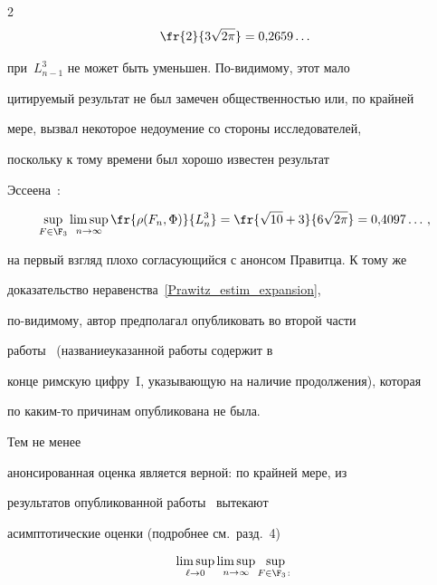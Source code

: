 \begin{multicols}{2}
$$


\fr{2}{3\sqrt{2\pi}}=0{,}2659\ldots






$$


при~$L_{n-1}^3$ не может быть уменьшен. По-видимому, этот мало


цитируемый результат не был замечен общественностью или, по крайней


мере, вызвал некоторое недоумение со стороны исследователей,


поскольку к тому времени был хорошо известен результат


Эссеена~\cite{Esseen1956}:


$$


\sup_{F\in\F_3}\limsup_{n\to\infty}\fr{\rho(F_n,\Phi)}{L_n^3}=


\fr{\sqrt{10}+3}{6\sqrt{2\pi}}=0{,}4097\ldots\,,


$$


на первый взгляд плохо согласующийся с анонсом Правитца. К тому же


доказательство неравенства~\eqref{Prawitz_estim_expansion},


по-ви\-ди\-мо\-му, автор предполагал опуб\-ли\-ко\-вать во второй части


работы~\cite{Prawitz1975} (название\linebreak указанной работы содержит в


конце римскую циф\-ру~I, указывающую на наличие продолжения), которая


по ка\-ким-то причинам опубликована не \mbox{была}. 


{





}





Тем не менее


анонсированная оценка является верной: по крайней мере, из


результатов опубликованной работы~\cite{Prawitz1975} вытекают


асимптотические оценки (подробнее см.\ разд.~4)


\begin{multline*}


\limsup_{\ell\to0}\limsup_{n\to\infty} \sup_{F\in\F_3\colon


}
\end{multline*}
\end{multicols}
